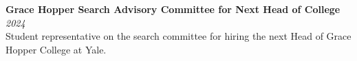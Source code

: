\documentclass[11pt]{article}
\newcommand{\entry}[3]{
    \vspace{-.58em}
    \textbf{#1} \hfill \textit{#2} \\
    #3 \vspace{0.5em}}
\begin{document}
\entry{Grace Hopper Search Advisory Committee for Next Head of College}{2024}{
  Student representative on the search committee for hiring the next Head of Grace Hopper College at Yale.
}

\iffalse
\entry{Yale Student Klezmer Band}{2021--}{
   Accordionist and former president.
}

\entry{Brookline High School -- Math Center Coach and Writing Center Coach}{2018-20}{
  \vspace{-1em}
}

\entry{North Carolina Democratic Party}{2020}{
  Volunteered in a phone bank to educate voters and assist with casting absentee ballots in North Carolina.
}
\fi
\end{document}
